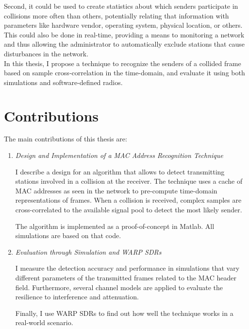 Second, it could be used to create statistics about which senders participate in collisions more often than others, potentially relating that information with parameters like hardware vendor, operating system, physical location, or others. This could also be done in real-time, providing a means to monitoring a network and thus allowing the administrator to automatically exclude stations that cause disturbances in the network.\\

In this thesis, I propose a technique to recognize the senders of a collided frame based on sample cross-correlation in the time-domain, and evaluate it using both simulations and software-defined radios.

\clearpage



\section{Contributions}

The main contributions of this thesis are:

\begin{enumerate}
	\item \textit{Design and Implementation of a MAC Address Recognition Technique}

	I describe a design for an algorithm that allows to detect transmitting stations involved in a collision at the receiver. The technique uses a cache of \gls{MAC} addresses as seen in the network to pre-compute time-domain representations of frames. When a collision is received, complex samples are cross-correlated to the available signal pool to detect the most likely sender.

	The algorithm is implemented as a proof-of-concept in Matlab. All simulations are based on that code.

	\item \textit{Evaluation through Simulation and WARP SDRs}

	I measure the detection accuracy and performance in simulations that vary different parameters of the transmitted frames related to the \gls{MAC} header field. Furthermore, several channel models are applied to evaluate the resilience to interference and attenuation.

	Finally, I use \gls{WARP} \glspl{SDR} to find out how well the technique works in a real-world scenario.
\end{enumerate}


